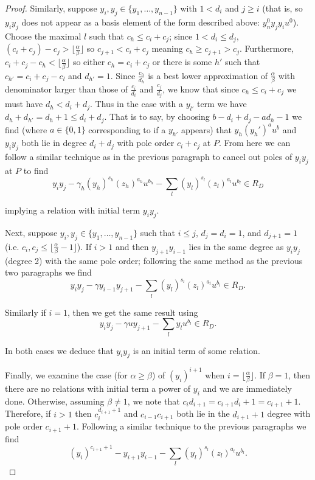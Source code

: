 \documentclass{amsart}
\theoremstyle{plain}
\theoremstyle{definition}
\theoremstyle{remark}
\numberwithin{equation}{section}
\begin{document}
\begin{proof}
Similarly, suppose $y_i,y_j\in \{y_1, \ldots ,y_{n-1}\}$ with $1<d_i$ and $j\ge i$ (that is, so 
$y_iy_j$ does not appear as a basis element of the form described above: $y_n^0 y_jy_i 
u^0$).  Choose the maximal $l$ such that $c_h\le c_i+c_j$; since $1<d_i\le d_j$, $(c_i
+c_j)-c_j>\lfloor \frac{\alpha}{\beta}\rfloor$ so $c_{j+1} < c_i + c_j$ meaning $c_h \ge c_{j
+1} > c_j$.  Furthermore, $c_i + c_j - c_h<\lfloor \frac{\alpha}{\beta} \rfloor$ so either 
$c_h=c_i+c_j$ or there is some $h'$ such that $c_{h'}=c_i+c_j-c_l$ and $d_{h'}=1$.  Since 
$\frac{c_h}{d_h}$ is a best lower approximation of $\frac{\alpha}{\beta}$ with denominator 
larger than those of $\frac{c_i}{d_i}$ and $\frac{c_j}{d_j}$, we know that since $c_h\le c_i
+c_j$ we must have $d_h<d_i+d_j$.  Thus in the case with a $y_{l'}$ term we have $d_h + 
d_{h'} = d_h + 1 \le d_i + d_j$.  That is to say, by choosing $b-d_i+d_j-ad_h-1$ we find 
(where $a\in\{0,1\}$ corresponding to if a $y_{h'}$ appears) that $y_h(y_h')^au^b$ and 
$y_iy_j$ both lie in degree $d_i+d_j$ with pole order $c_i+c_j$ at $P$.  From here we can 
follow a similar technique as in the previous paragraph to cancel out poles of $y_iy_j$ at $P
$ to find
\[
	y_iy_j-\gamma_h (y_h)^{s_h}(z_{h})^{a_h}u^{b_h}-\sum_l (y_l)^{s_l} (z_{l})^{a_l}
u^{b_l}\in R_D
\]

\noindent
implying a relation with initial term $y_i y_j$.  

Next, suppose $y_i, y_j\in \{y_1, \ldots ,y_{n-1}\}$ such that $i\le j$, $d_j=d_i=1$, and $d_{j
+1}=1$ (i.e. $c_i, c_j \le \lfloor \frac{\alpha}{\beta} - 1 \rfloor$).  If $i>1$ and then $y_{j+1}
y_{i-1}$ lies in the same degree as $y_iy_j$ (degree 2) with the same pole order; following 
the same method as the previous two paragraphs we find
\[
	y_i y_j - \gamma y_{i-1} y_{j+1} - \sum_{l} (y_l)^{s_l} (z_l)^{a_l}u^{b_l}\in R_D.
\]

\noindent
Similarly if $i=1$, then we get the same result using
\[
	y_i y_j - \gamma u y_{j+1} - \sum_l y_l u^{b_l} \in R_D.
\]

\noindent
In both cases we deduce that $y_iy_j$ is an initial term of some relation.

Finally, we examine the case (for $\alpha \ge \beta$) of $(y_i)^{i + 1}$ when $i=\lfloor 
\frac{\alpha}{\beta}\rfloor$.  If $\beta=1$, then there are no relations with initial term a 
power of $y_i$ and we are immediately done.  Otherwise, assuming $\beta\ne 1$, we note 
that $c_id_{i+1}=c_{i+1}d_i+1=c_{i+1}+1$.   Therefore, if $i>1$ then $c_i^{d_{i+1}+1}$ and $c_{i-1} c_{i+1}$ both lie in the 
$d_{i+1}+1$ degree with pole order $c_{i+1}+1$.  Following a similar technique to the 
previous paragraphs we find
\[
	(y_i)^{c_{i+1}+1} - y_{i+1} y_{i-1} - \sum_l (y_l)^{s_l}(z_l)^{a_l} u^{b_l}.
\]


\end{proof}
\end{document}
